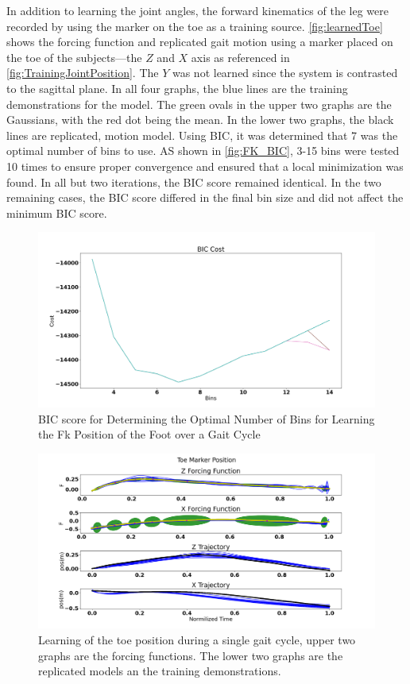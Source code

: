 In addition to learning the joint angles, the forward kinematics of the leg were recorded by using the marker on the toe as a training source. \autoref{fig:learnedToe} shows the forcing function and replicated gait motion using a marker placed on the toe of the subjects—the $Z$ and $X$ axis as referenced in \autoref{fig:TrainingJointPosition}. The $Y$ was not learned since the system is contrasted to the sagittal plane. In all four graphs, the blue lines are the training demonstrations for the model. The green ovals in the upper two graphs are the Gaussians, with the red dot being the mean. In the lower two graphs, the black lines are replicated, motion model. Using BIC, it was determined that 7 was the optimal number of bins to use. AS shown in \autoref{fig:FK_BIC}, 3-15 bins were tested 10 times to ensure proper convergence and ensured that a local minimization was found. In all but two iterations, the BIC score remained identical. In the two remaining cases, the BIC score differed in the final bin size and did not affect the minimum BIC score.


\begin{figure}
    \centering
    \includegraphics[scale=0.25]{images/gait_data/BIC_FK.png}
    \caption[FK BIC Score]{BIC score for Determining the Optimal Number of Bins for Learning the Fk Position of the Foot over a Gait Cycle}
    \label{fig:FK_BIC}
\end{figure}


\begin{figure}[!htb]
    \centering
    \includegraphics[scale=0.35]{images/gait_data/toe_maker_pos.png}
    \caption[Toe Marker Position]{Learning of the toe position during a single gait cycle, upper two graphs are the forcing functions. The lower two graphs are the replicated models an the training demonstrations.}
    \label{fig:learnedToe}
\end{figure}


